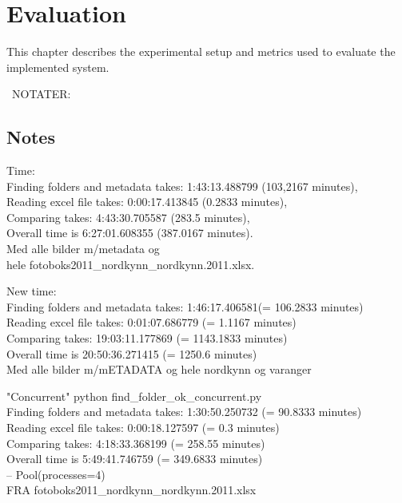 \documentclass[USenglish]{uit-thesis}
\begin{document}
\chapter{Evaluation} \label{chap:evaluation}
This chapter describes the experimental setup and metrics used to evaluate the implemented system. 


\iffalse
\ NOTATER:
\section{Notes}
\item Time: \\
Finding folders and metadata takes:  1:43:13.488799 (103,2167 minutes), \\
Reading excel file takes:  0:00:17.413845 (0.2833 minutes),\\
Comparing takes:  4:43:30.705587 (283.5 minutes),\\
Overall time is  6:27:01.608355 (387.0167 minutes).\\
Med alle bilder m/metadata og \\
hele fotoboks2011\_nordkynn\_nordkynn.2011.xlsx.

\item New time: \\
Finding folders and metadata takes:  1:46:17.406581(= 106.2833 minutes) \\
Reading excel file takes:  0:01:07.686779 (= 1.1167 minutes) \\
Comparing takes:  19:03:11.177869 (= 1143.1833 minutes) \\
Overall time is  20:50:36.271415 (= 1250.6 minutes) \\
Med alle bilder m/mETADATA og hele nordkynn og varanger

\item "Concurrent" python find\_folder\_ok\_concurrent.py \\
Finding folders and metadata takes:  1:30:50.250732 (= 90.8333 minutes) \\
Reading excel file takes:  0:00:18.127597 (= 0.3 minutes)\\
Comparing takes:  4:18:33.368199 (= 258.55 minutes)\\
Overall time is  5:49:41.746759 (= 349.6833 minutes)\\
-- Pool(processes=4) \\
FRA fotoboks2011\_nordkynn\_nordkynn.2011.xlsx
\end{document}

